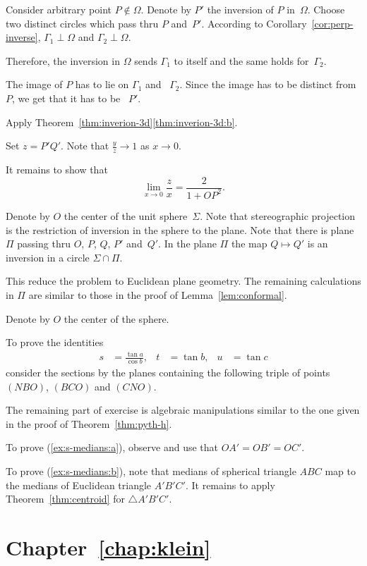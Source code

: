 Consider arbitrary point $P\notin\Omega$.
Denote by $P'$ the inversion of $P$ in~$\Omega$.
Choose two distinct circles which pass thru $P$ and~$P'$.
According to Corollary~\ref{cor:perp-inverse}, 
$\Gamma_1\perp \Omega$ and $\Gamma_2\perp \Omega$.

Therefore, the inversion in $\Omega$ sends $\Gamma_1$ to itself and the same holds for~$\Gamma_2$. 

The image of $P$ has to lie on $\Gamma_1$ and ~$\Gamma_2$.
Since the image has to be distinct from $P$, we get that it has to be ~$P'$.

Apply Theorem~\ref{thm:inverion-3d}\ref{thm:inverion-3d:b}.

Set $z=P'Q'$.
Note that $\tfrac yz\to 1$ as $x\to 0$.

It remains to show that 
$$\lim_{x\to 0} \frac{z}{x}=\frac{2}{1+OP^2}.$$

Denote by $O$ the center of the unit sphere~$\Sigma$.
Note that stereographic projection is the restriction of inversion in the sphere to the plane.
Note that there is plane $\Pi$ passing thru $O$, $P$, $Q$, $P'$ and~$Q'$.
In the plane $\Pi$ the map $Q\mapsto Q'$ is an inversion in a circle $\Sigma\cap \Pi$.

This reduce the problem to Euclidean plane geometry.
The remaining calculations in $\Pi$ are similar to those in the proof of  Lemma~\ref{lem:conformal}.



Denote by $O$ the center of the sphere.

To prove the identities
\begin{align*}
s&=\tfrac{\tan a}{\cos b},
&
t&=\tan b,
&
u&=\tan c
\end{align*}
consider the sections by the planes containing the following triple of points $(NBO)$, $(BCO)$ and $(CNO)$.

The remaining part of exercise is algebraic manipulations similar to the one given in the proof of Theorem~\ref{thm:pyth-h}.

To prove (\ref{ex:s-medians:a}),
observe and use that 
$OA'=OB'=OC'$.

To prove (\ref{ex:s-medians:b}), note that medians of spherical triangle $ABC$ 
map to the medians of Euclidean triangle $A'B'C'$.
It remains to apply Theorem~\ref{thm:centroid} for $\triangle A'B'C'$.


\section*{Chapter~\ref{chap:klein}}
\setcounter{eqtn}{0}


